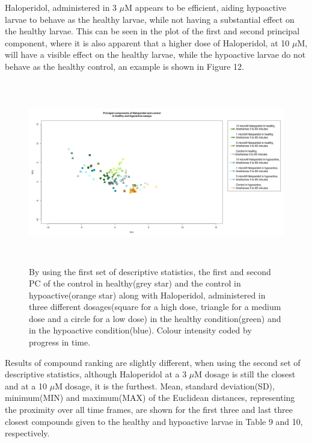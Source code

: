 \documentclass[a4paper,12pt]{article}
\begin{document}
Haloperidol, administered in 3 $\mu$M appears to be efficient, aiding hypoactive larvae to behave as the healthy larvae, while not having a substantial effect on the healthy larvae. This can be seen in the plot of the first and second principal component, where it is also apparent that a higher dose of Haloperidol, at 10 $\mu$M, will have a visible effect on the healthy larvae, while the hypoactive larvae do not behave as the healthy control, an example is shown in Figure 12.
\begin{figure}[h!]
\begin{center}
\includegraphics[width=16cm,height=8cm]{Haloperidol_Control_DarkApoLow.png}
\caption{By using the first set of descriptive statistics, the first and second PC of the control in healthy(grey star) and the control in hypoactive(orange star) along with Haloperidol, administered in three different dosages(square for a high dose, triangle for a medium dose and a circle for a low dose) in the healthy condition(green) and in the hypoactive condition(blue). Colour intensity coded by progress in time.}
\end{center}
\end{figure}
\newpage
Results of compound ranking are slightly different, when using the second set of descriptive statistics, although Haloperidol at a 3 $\mu$M dosage is still the closest and at a 10 $\mu$M dosage, it is the furthest. Mean, standard deviation(SD), minimum(MIN) and maximum(MAX) of the Euclidean distances, representing the proximity over all time frames, are shown for the first three and last three closest compounds given to the healthy and hypoactive larvae in Table 9 and 10, respectively.
\end{document}
